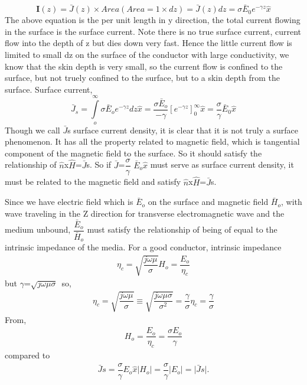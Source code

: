 \begin{dmath}
\textbf{I}(z)=\bar{J}(z)\times Area (Area=1\times dz)=\bar{J}(z)dz=\sigma\bar{E}_0e^{-\gamma z} \hat{x}
\end{dmath}
The above equation is the per unit length in y direction, the total current flowing in the surface is the surface current. Note there is no true surface current, current flow into the depth of z but dies down very fast. Hence the little current flow is limited to small dz on the surface of the conductor with large conductivity, we know that the skin depth is very small, so the current flow is confined to the surface, but not truely confined to the surface, but to a skin depth from the surface.
Surface current,
\begin{dmath}
\bar{J}_s=\int\limits_o^\infty\sigma\bar{E}_o e^{-\gamma z}dz\hat{x}
=\frac{\sigma\bar{E}_o}{-\gamma}[e^{-\gamma z}]_0^\infty \hat{x}=\frac{\sigma}{\gamma}\bar{E}_0\hat{x}
\end{dmath}
Though we call $\bar{J}$s surface current density, it is clear that it is not truly a surface phenomenon. It has all the property related to magnetic field, which is tangential component of the magnetic field to the surface. So it should satisfy the relationship of $\hat{n}$x$\hat{H}$=$\bar{J}$s. So if 
$\bar{J}$=$\dfrac{\sigma}{\gamma}$
$\bar{E}$$_o$$\hat{x}$ must serve as surface current density, it must be related to the magnetic field and satisfy $\hat{n}$x$\hat{H}$=$\bar{J}$s.

Since we have electric field which is $\bar{E}$$_o$ on the surface and magnetic field $\bar{H}$$_o$, with wave traveling in the Z direction for transverse electromagnetic wave and the medium unbound, $\dfrac{\bar{E}_o}{\bar{H}_o}$ must satisfy the relationship of being of equal to the intrinsic impedance of the media.
For a good conductor, intrinsic impedance
\begin{align}
\eta_{c}=\sqrt{\dfrac{j\omega\mu}{\sigma}}
H_{o}=\dfrac{E_{o}}{\eta_{c}}
\end{align} 
but $\gamma$=$\sqrt{j\omega\mu\sigma}$\ so,
\begin{align}
\eta_{c}=\sqrt{\dfrac{j\omega\mu}{\sigma}}\equiv\sqrt{\dfrac{j\omega\mu\sigma}{\sigma^{2}}}=\dfrac{\gamma}{\sigma}
\eta_{c}=\dfrac{\gamma}{\sigma}
\end{align}
From,
\begin{align}
H_{o}=\dfrac{E_{o}}{\eta_{c}}=\dfrac{\sigma E_{o}}{\gamma}
\end{align}
compared to 
\begin{align}
\bar{J}s=\dfrac{\sigma}{\gamma}E_{o}\hat{x}
\lvert H_{o}\rvert=\dfrac{\sigma}{\gamma}\lvert E_{o}\rvert=\rvert \bar{J}s\rvert.
\end{align}


